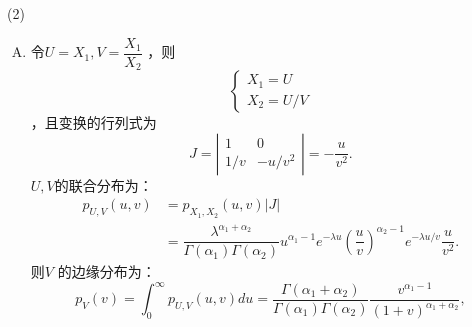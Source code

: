 \begin{example}
    (2)
    \begin{enumerate}[A.]
        \item 令$ U=X_1,V=\dfrac{X_1}{X_2}$ ，则 
        \[
            \left\{ \begin{array}{ll} X_{1}=U \\ X_{2}=U/V \end{array}\right.
        \]
        ，且变换的行列式为 
        \[
            J= \left | \begin{array}{ccc} 1 & 0 \\ 1/v & -u/v^2 \end{array} \right |=-\dfrac{u}{v^2}.
        \]
        $U,V $的联合分布为： 
        \[
            \begin{aligned} p_{U,V}(u,v)&=p_{X_1,X_2}(u,v)|J| \\ &=\dfrac{\lambda^{\alpha_1+\alpha_2}}{\Gamma(\alpha_1)\Gamma(\alpha_2)}u^{\alpha_1-1}e^{-\lambda u} \left(\dfrac{u}{v} \right)^{\alpha_2-1}e^{-\lambda u/v }\dfrac{u}{v^2}. \end{aligned}
        \]
        则$ V$ 的边缘分布为： 
        \[
            p_{V}(v)=\int_{0}^{\infty} p_{U,V}(u,v)du=\dfrac{\Gamma(\alpha_1+\alpha_2)}{\Gamma(\alpha_1)\Gamma(\alpha_2)}\dfrac{v^{\alpha_1-1}}{(1+v)^{\alpha_1+\alpha_2}},
        \]


\end{enumerate}
\end{example}
